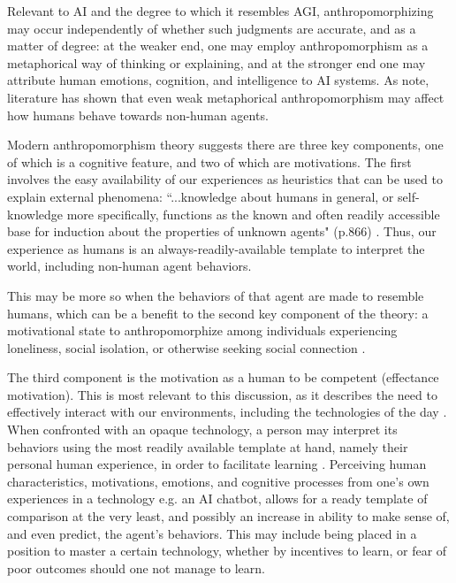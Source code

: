 \documentclass{article}
\theoremstyle{plain}
\theoremstyle{definition}
\theoremstyle{remark}
\begin{document}
Relevant to AI and the degree to which it resembles AGI, anthropomorphizing may occur independently of whether such judgments are accurate, and as a matter of degree: at the weaker end, one may employ anthropomorphism as a metaphorical way of thinking or explaining, and at the stronger end one may attribute human emotions, cognition, and intelligence to AI systems. As \citet{epley2007seeing} note, literature has shown that even weak metaphorical anthropomorphism may affect how humans behave towards non-human agents.

Modern anthropomorphism theory
suggests there are three key components, one of which is a cognitive feature, and two of which are motivations. The first involves the easy availability of our experiences as heuristics that can be used to explain external phenomena: ``...knowledge about humans in general, or self-knowledge more specifically, functions as the known and often readily accessible base for induction about the properties of unknown agents" (p.866) \cite{epley2007seeing, waytz2010social}. Thus, our experience as humans is an always-readily-available template to interpret the world, including non-human agent behaviors. 

This may be more so when the behaviors of that agent are made to resemble humans, which can be a benefit to the second key component of the theory: a motivational state to anthropomorphize among individuals experiencing loneliness, social isolation, or otherwise seeking social connection \cite{epley2007seeing, waytz2010social}. 

The third component is the motivation as a human to be competent (effectance motivation). This is most relevant to this discussion, as it describes the need to effectively interact with our environments, including the technologies of the day \cite{epley2007seeing}. When confronted with an opaque technology, a person may interpret its behaviors using the most readily available template at hand, namely their personal human experience, in order to facilitate learning \cite{epley2007seeing, waytz2010social}. Perceiving human characteristics, motivations, emotions, and cognitive processes from one's own experiences in a technology e.g. an AI chatbot, allows for a ready template of comparison at the very least, and possibly an increase in ability to make sense of, and even predict, the agent's behaviors. This may include being placed in a position to master a certain technology, whether by incentives to learn, or fear of poor outcomes should one not manage to learn. 
\end{document}
